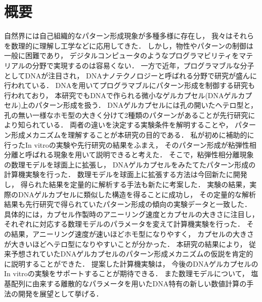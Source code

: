 \chapter*{概要}

自然界には自己組織的なパターン形成現象が多種多様に存在し，
我々はそれらを数理的に理解し工学などに応用してきた．
しかし，物性やパターンの制御は一般に困難であり，
デジタルコンピュータのようなプログラマビリティをマテリアルの分野で実現するのは容易くない．
一方で近年，プログラマブルな分子としてDNAが注目され，
DNAナノテクノロジーと呼ばれる分野で研究が盛んに行われている．
DNAを用いてプログラマブルにパターン形成を制御する研究も行われており，
本研究でもDNAで作られる微小なゲルカプセル(DNAゲルカプセル)上のパターン形成を扱う．
DNAゲルカプセルには孔の開いたヘテロ型と，
孔の無い一様なホモ型の大きく分けて2種類のパターンがあることが先行研究により知られている．
両者の違いを決定する実験条件を解明することや，
パターン形成メカニズムを理解することが本研究の目的である．
私が初めに補助的に行ったIn vitroの実験や先行研究の結果をふまえ，
そのパターン形成が粘弾性相分離と呼ばれる現象を用いて説明できると考えた．
そこで，粘弾性相分離現象の数理モデルを球面上に拡張し，
DNAゲルカプセルをみたてたパターン形成の計算機実験を行った．
数理モデルを球面上に拡張する方法は今回新たに開発し，
得られた結果を定量的に解析する手法も新たに考案した．
%
実験の結果，実際のDNAゲルカプセルに類似した構造を得ることに成功し，
その定量的な解析結果も先行研究で得られていたパターン形成の傾向の実験データと一致した．
具体的には，カプセル作製時のアニーリング速度とカプセルの大きさに注目し，
それぞれに対応する数理モデルのパラメータを変えて計算機実験を行った．
その結果，アニーリング速度が速いほどホモ型になりやすく，
カプセルの大きさが大きいほどヘテロ型になりやすいことが分かった．
%
本研究の結果により，
従来予想されていたDNAゲルカプセルのパターン形成メカニズムの仮説を肯定的に説明することができた．
提案した計算機実験は，
今後のDNAゲルカプセルのIn vitroの実験をサポートすることが期待できる．
また数理モデルについて，
塩基配列に由来する離散的なパラメータを用いたDNA特有の新しい数値計算の手法の開発を展望として挙げる．
